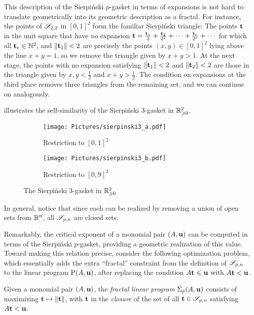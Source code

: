\documentclass[11pt]{amsart}
\begin{document}
This description of the Sierpi\'nski $p$-gasket in terms of expansions is not hard to translate geometrically into its geometric description as a fractal. 
For instance, the points of $\mathscr{S}_{2,2}$ in $[0,1]^2$ form the familiar Sierpi\'nski triangle:   
The points $\mathbf{t}$ in the unit square that have \emph{no} expansion $\mathbf{t} = \frac{\mathbf{t}_1}{2} +\frac{\mathbf{t}_2}{2^2}+\cdots +\frac{\mathbf{t}_e}{2^e} + \cdots$ for which all $\mathbf{t}_e \in \mathbb{N}^2$, and $\| \mathbf{t}_1 \| < 2$ are precisely the points $(x,y) \in [0,1]^2$ lying above the line $x+y=1$, so we remove the triangle given by $x+y>1$.
At the next stage, the points with no expansion satisfying $\| \mathbf{t}_1 \| < 2$ and  $\| \mathbf{t}_2 \| < 2$ are those in the triangle given by $x, y < \frac{1}{2}$ and $x+y > \frac{1}{2}$.  
The condition on expansions at the third place removes three triangles from the remaining set, and we can continue on analogously. 

 illustrates the self-similarity of the Sierpi\'nski $3$-gasket in $\mathbb{R}_{\geqslant 0}^2$.
\begin{figure}
\begin{subfigure}{.49\textwidth}
  \centering
  \texttt{[image: Pictures/sierpinski3\_a.pdf]}
  \caption{Restriction to $[0,1]^2$}
\end{subfigure}
\begin{subfigure}{.49\textwidth}
  \centering
  \texttt{[image: Pictures/sierpinski3\_b.pdf]}  
  \caption{Restriction to $[0,9]^2$}
\end{subfigure}
\caption{The Sierpi\'nski 3-gasket in $\mathbb{R}_{\geqslant 0}^2$}
\label{fig: sierpinski 3-gasket}
\end{figure}
In general, notice that since each can be realized by removing a union of open sets from $\mathbb{R}^n$, all $\mathscr{S}_{p,n}$ are closed sets.  

Remarkably, the critical exponent of a monomial pair $(A, \mathbf{u})$ can be computed in terms of the Sierpi\'nski $p$-gasket, providing a geometric realization of this value.
Toward making this relation precise, consider the following optimization problem, which essentially adds the extra ``fractal'' constraint from the definition of $\mathscr{S}_{p,n}$ to 
the linear program $\mathrm{P}(A, \mathbf{u})$, after replacing the condition $A \mathbf{t} \leqslant \mathbf{u}$ with $A \mathbf{t} < \mathbf{u}$. 

\begin{definition}
Given a monomial pair $(A, \mathbf{u})$, the \emph{fractal linear program} $\Sigma_p(A,\mathbf{u})$ consists of maximizing $\mathbf{t}\mapsto \| \mathbf{t} \|$, with $\mathbf{t}$ in the \emph{closure} of the set of all $\mathbf{t}\in \mathscr{S}_{p,n}$ satisfying $A\mathbf{t} < \mathbf{u}$.
\end{definition}
\end{document}
